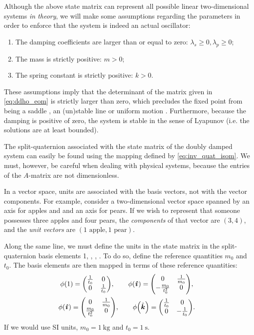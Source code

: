 Although the above state matrix can represent all possible linear two-dimensional systems \emph{in theory}, we will make some assumptions regarding the parameters in order to enforce that the system is indeed an actual oscillator:
\begin{enumerate}[label=(\roman*), align=left, leftmargin=1.5cm]
    \item The damping coefficients are larger than or equal to zero: $\lambda_s \geq 0, \lambda_p \geq 0$;
    \item The mass is strictly positive: $m > 0$;
    \item The spring constant is strictly positive: $k > 0$.
\end{enumerate}
These assumptions imply that the determinant of the matrix given in \cref{eq:ddho_eom} is strictly larger than zero, which precludes the fixed point from being a saddle , an (un)stable line  or uniform motion . Furthermore, because the damping is positive of zero, the system is stable in the sense of Lyapunov (i.e. the solutions are at least bounded).

The split-quaternion associated with the state matrix of the doubly damped system can easily be found using the mapping defined by \cref{eq:inv_quat_isom}. We must, however, be careful when dealing with physical systems, because the entries of the \(A\)-matrix are not dimensionless. 

In a vector space, units are associated with the basis vectors, not with the vector components. For example, consider a two-dimensional vector space spanned by an axis for apples and and an axis for pears. If we wish to represent that someone possesses three apples and four pears, the \emph{components} of that vector are \((3, 4)\), and the \emph{unit vectors} are \((1 \text{ apple}, 1\text{ pear})\). 

Along the same line, we must define the units in the state matrix in the split-quaternion basis elements 1, \quati, \quatj, \quatk. To do so, define the reference quantities \(m_0\) and \(t_0\). The basis elements are then mapped in terms of these reference quantities:
\begin{gather}
    \phi\qty(1) = \mqty(\tfrac{1}{t_0} & 0 \\ 0 & \tfrac{1}{t_0}), \qquad 
    \phi\qty(\quati) = \mqty(0 & \tfrac{1}{m_0} \\  -\tfrac{m_0}{t_0^2} & 0), \\
    \phi\qty(\quati) = \mqty(0 & \tfrac{1}{m_0} \\  \tfrac{m_0}{t_0^2} & 0), \qquad
    \phi\qty(\quatk) = \mqty(\tfrac{1}{t_0} & 0 \\ 0 & -\tfrac{1}{t_0}).
\end{gather}
If we would use SI units, \(m_0 = \SI{1}{\kilogram}\) and \(t_0 = \SI{1}{\second}\). 

